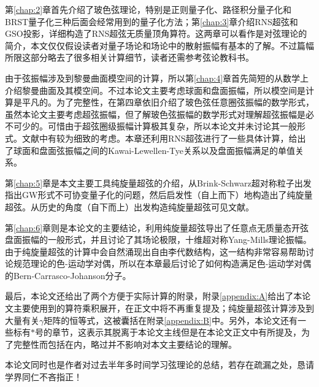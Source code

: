 第\ref{chap:2}章首先介绍了玻色弦理论，特别是正则量子化、路径积分量子化和BRST量子化三种后面会经常用到的量子化方法；第\ref{chap:3}章介绍RNS超弦和GSO投影，详细构造了RNS超弦无质量顶角算符。这两章可以看作是对弦理论的简介，本文仅仅假设读者对量子场论和场论中的散射振幅有基本的了解。不过篇幅所限这部分略去了很多相关计算细节，读者还需参考弦论教科书。\cite{Polchinski:1998rq,Polchinski:1998rr,Blumenhagen:2013fgp,Becker:2006dvp,Green:2012oqa,Green:2012pqa,Cecotti:2023dnp,Kiritsis:2019npv}

由于弦振幅涉及到黎曼曲面模空间的计算，所以第\ref{chap:4}章首先简短的从数学上介绍黎曼曲面及其模空间。不过本论文主要考虑球面和盘面振幅，所以模空间是计算是平凡的。为了完整性，在第四章依旧介绍了玻色弦任意圈弦振幅的数学形式，虽然本论文主要考虑超弦振幅，但了解玻色弦振幅的数学形式对理解超弦振幅是必不可少的。可惜由于超弦圈级振幅计算极其复杂，所以本论文并未讨论其一般形式。文献\cite{Witten:2012bh,DHoker:2002hof}中有较为细致的考虑。本章还利用RNS超弦进行了一些具体计算，给出了球面和盘面弦振幅之间的Kawai-Lewellen-Tye关系以及盘面振幅满足的单值关系。

第\ref{chap:5}章是本文主要工具纯旋量超弦的介绍，从Brink-Schwarz超对称粒子出发指出GW形式不可协变量子化的问题，然后启发性（自上而下）地构造出了纯旋量超弦。从历史的角度（自下而上）出发构造纯旋量超弦可见文献\cite{Berkovits:2002zk,Mafra:2008gkx}。

第\ref{chap:6}章则是本论文的主要结论，利用纯旋量超弦导出了任意点无质量态开弦盘面振幅的一般形式，并且讨论了其场论极限，十维超对称Yang-Mills理论振幅。由于纯旋量超弦的计算中会自然涌现出自由李代数结构，这一结构非常容易帮助讨论规范理论的色-运动学对偶，所以在本章最后讨论了如何构造满足色-运动学对偶的Bern-Carrasco-Johanson分子\cite{Mafra:2011kj}。

最后，本论文还给出了两个方便于实际计算的附录，附录\ref{appendix:A}给出了本论文主要使用到的算符乘积展开，在正文中将不再重复提及；纯旋量超弦计算涉及到大量有关$\gamma$矩阵的恒等式，这被囊括在附录\ref{appendix:B}中。另外，本论文还有一些标有$*$号的章节，这表示其脱离于本论文主线但是在本论文正文中有所提及，为了完整性而包括在内，略过并不影响对本文主要结论的理解。

本论文同时也是作者对过去半年多时间学习弦理论的总结，若存在疏漏之处，恳请学界同仁不吝指正！